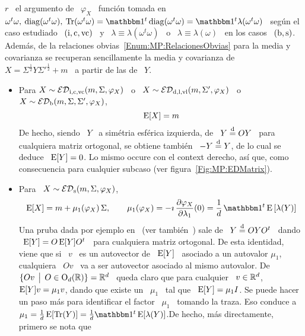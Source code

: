 \begin{itemize}
  $r$ \ el argumento de \  $\varphi_X$ \ funci\'on tomada en \ $\omega^t \omega,
  \:  \diag(\omega^t \omega),  \:  \Tr(\omega^t \omega)  = \un^t  \diag(\omega^t
  \omega)  = \un^t  \lambda(\omega^t  \omega)$  \ seg\'un  el  caso estudiado  \
  $(\mathrm{i},\mathrm{c},\mathrm{vc})$  \ y  \ $\lambda  \equiv \lambda(\omega^t  \omega)$ \  o \
  $\lambda \equiv \lambda(\omega)$ \  en los casos \ $(\mathrm{b},\mathrm{s})$.  Adem\'as,
  de  la  relaciones   obvias~\ref{Enum:MP:RelacionesObvias}  para  la  media  y
  covarianza  se  recuperan  sencillamente la  media  y  covarianza  de \  $X  =
  \Sigma^{\frac12} Y \Sigma'^{\frac12} + m$ \ a partir de las de \ $Y$.
  \begin{itemize}
  \item Para  $X \sim \mathcal{ED}_{\mathrm{i},\mathrm{c},\mathrm{vc}}(m,\Sigma,\varphi_X)$  \ o \  $X \sim
    \mathcal{ED}_{\mathrm{d},\mathrm{l},\mathrm{vl}}(m,\Sigma',\varphi_X)$     \     o     \    $X     \sim
    \mathcal{ED}_{\mathrm{b}}(m,\Sigma,\Sigma',\varphi_X)$,
    \[
    \operatorname{E}[X] = m
    \]
    De hecho, siendo \ $Y$ \ a sim\'etria esf\'erica izquierda, de \ $Y \stackrel{\mathrm{d}}{=} O
    Y$ \ para cualquiera matriz ortogonal, se obtiene tambi\'en \ $- Y \stackrel{\mathrm{d}}{=} Y$,
    de  lo cual  se deduce  \ $\operatorname{E}[Y]  = 0$.   Lo mismo  occure con  el context
    derecho,  as\'i   que,  como   consecuencia  para  cualquier   subcaso  (ver
    figura~\ref{Fig:MP:EDMatrix}).
  \item Para \ $X \sim \mathcal{ED}_{\mathrm{s}}(m,\Sigma,\varphi_X)$,
    \[
    \Esp[X] = m + \mu_1(\varphi_X) \, \Sigma, \qquad \mu_1(\varphi_X) = - \imath
    \, \frac{\partial  \varphi_X}{\partial \lambda_1}(0) =  \frac{1}{d} \, \un^t
    \Esp\left[ \lambda(Y) \right]
    \]
    Una    pruba    dada    por   ejemplo    en~\cite[\S~13.2]{BilBre99}    (ver
    tambi\'en~\cite{Mal61,  Tyl82}) sale  de \  $Y  \stackrel{\mathrm{d}}{=} O  Y O^t$  \ dando  \
    $\operatorname{E}[Y]  = O  \operatorname{E}[Y]  O^t$ \  para  cualquiera matriz  ortogonal. De  esta
    identidad, viene que si \ $v$ \ es un autovector de \ $\operatorname{E}[Y]$ \ asociado a
    un autovalor $\mu_1$,  cualquiera \ $O v$ \ va a  ser autovector asociado al
    mismo autovalor.  De \ $\{ O v \:\: \big| \:\: O \in \mathrm{O}_d(\mathbb{R}) \} = \mathbb{R}^d$ \ queda
    claro que  para cualquier \  $v \in \mathbb{R}^d$,  \quad $\operatorname{E}[Y] v =  \mu_1 v$,
    dando que  existe un \  $\mu_1$ \ tal  que \ $\operatorname{E}[Y]  = \mu_1 I$.  Se puede
    hacer un paso m\'as para identificar el factor \ $\mu_1$ \ tomando la traza.
    Eso  conduce a  \  $\mu_1  = \frac{1}{d}  \Esp[\Tr(Y)]  = \frac{1}{d}  \un^t
    \Esp[\lambda(Y)]$.\newline De hecho, m\'as directamente, primero se nota que

\end{itemize}
\end{itemize}
